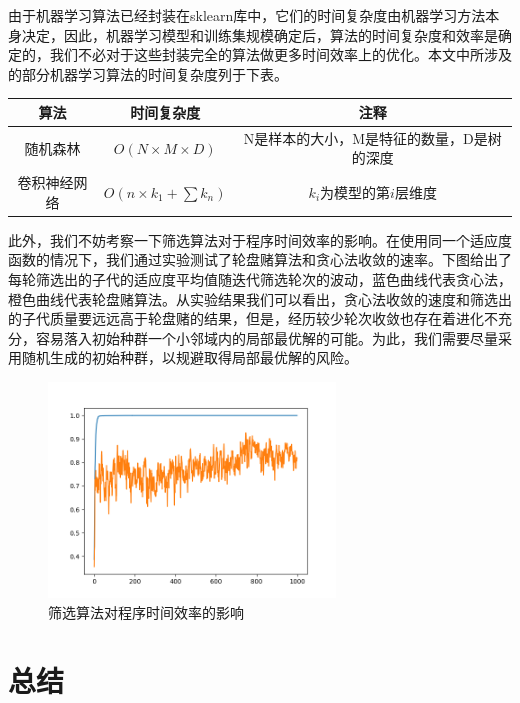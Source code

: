 \documentclass[UTF8,a4paper,10pt]{ctexart}
\begin{document}
    由于机器学习算法已经封装在sklearn库中，它们的时间复杂度由机器学习方法本身决定，因此，机器学习模型和训练集规模确定后，算法的时间复杂度和效率是确定的，我们不必对于这些封装完全的算法做更多时间效率上的优化。本文中所涉及的部分机器学习算法的时间复杂度列于下表。
    \begin{center}
        \begin{tabular}{ccc}
            \toprule
            算法&时间复杂度&注释\\
            \midrule
            随机森林&$O(N\times M\times D)$&N是样本的大小，M是特征的数量，D是树的深度\\
            卷积神经网络&$O(n\times k_1 + \sum k_n)$&$k_i$为模型的第$i$层维度\\
            \bottomrule
        \end{tabular}
    \end{center}
    此外，我们不妨考察一下筛选算法对于程序时间效率的影响。在使用同一个适应度函数的情况下，我们通过实验测试了轮盘赌算法和贪心法收敛的速率。下图给出了每轮筛选出的子代的适应度平均值随迭代筛选轮次的波动，蓝色曲线代表贪心法，橙色曲线代表轮盘赌算法。从实验结果我们可以看出，贪心法收敛的速度和筛选出的子代质量要远远高于轮盘赌的结果，但是，经历较少轮次收敛也存在着进化不充分，容易落入初始种群一个小邻域内的局部最优解的可能。为此，我们需要尽量采用随机生成的初始种群，以规避取得局部最优解的风险。

    \begin{figure}[H]
        \centering
        \includegraphics[width=3in]{compare.png}
        \caption{筛选算法对程序时间效率的影响}
        \label{}
    \end{figure}

    \section{\textcolor[rgb]{0,0.3,0.6}{总结}}
\end{document}
